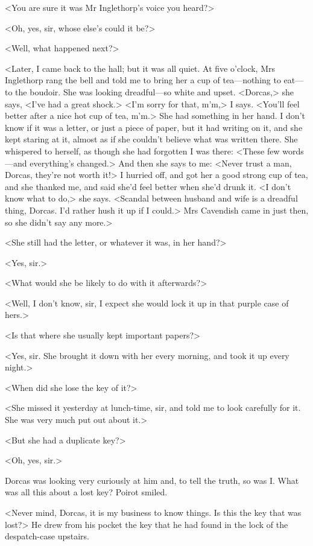  <You are sure it was Mr Inglethorp's voice you heard?> 

 <Oh, yes, sir, whose else's could it be?> 

 <Well, what happened next?> 

 <Later, I came back to the hall; but it was all quiet. At five o'clock, Mrs Inglethorp rang the bell and told me to bring her a cup of tea—nothing to eat—to the boudoir. She was looking dreadful—so white and upset. <Dorcas,> she says, <I've had a great shock.> <I'm sorry for that, m'm,> I says. <You'll feel better after a nice hot cup of tea, m'm.> She had something in her hand. I don't know if it was a letter, or just a piece of paper, but it had writing on it, and she kept staring at it, almost as if she couldn't believe what was written there. She whispered to herself, as though she had forgotten I was there: <These few words—and everything's changed.> And then she says to me: <Never trust a man, Dorcas, they're not worth it!> I hurried off, and got her a good strong cup of tea, and she thanked me, and said she'd feel better when she'd drunk it. <I don't know what to do,> she says. <Scandal between husband and wife is a dreadful thing, Dorcas. I'd rather hush it up if I could.> Mrs Cavendish came in just then, so she didn't say any more.> 

 <She still had the letter, or whatever it was, in her hand?>



 <Yes, sir.> 

 <What would she be likely to do with it afterwards?> 

 <Well, I don't know, sir, I expect she would lock it up in that purple case of hers.> 

 <Is that where she usually kept important papers?> 

 <Yes, sir. She brought it down with her every morning, and took it up every night.> 

 <When did she lose the key of it?> 

 <She missed it yesterday at lunch-time, sir, and told me to look carefully for it. She was very much put out about it.> 

 <But she had a duplicate key?> 

 <Oh, yes, sir.> 

 Dorcas was looking very curiously at him and, to tell the truth, so was I. What was all this about a lost key? Poirot smiled. 

 <Never mind, Dorcas, it is my business to know things. Is this the key that was lost?> He drew from his pocket the key that he had found in the lock of the despatch-case upstairs. 

